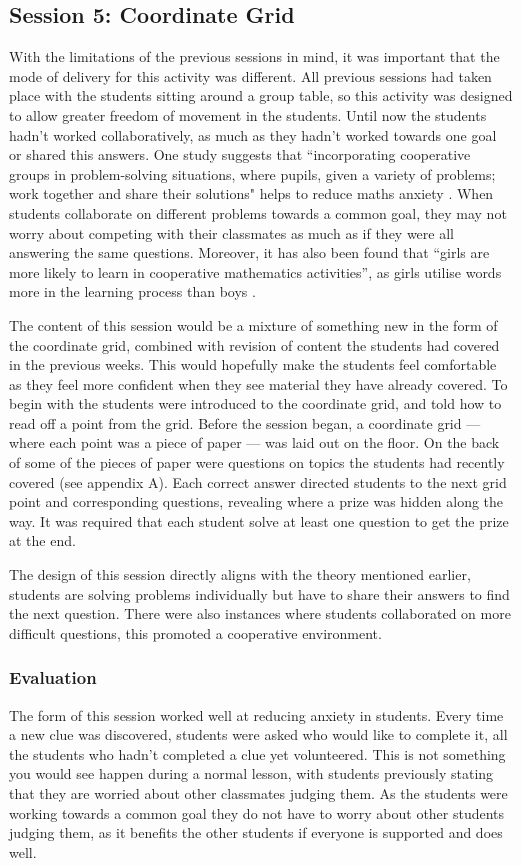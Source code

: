 \documentclass[11pt, a4paper, notitlepage]{article}
\begin{document}
\subsection{Session 5: Coordinate Grid}
With the limitations of the previous sessions in mind, it was important that the mode of delivery for this activity was different. All previous sessions had taken place with the students sitting around a group table, so this activity was designed to allow greater freedom of movement in the students. Until now the students hadn't worked collaboratively, as much as they hadn't worked towards one goal or shared this answers. One study suggests that ``incorporating cooperative groups in problem-solving situations, where pupils, given a  variety of problems; work together and share their solutions" helps to reduce maths anxiety \cite{Alkan:2013}. When students collaborate on different problems towards a common goal, they may not worry about competing with their classmates as much as if they were all answering the same questions. Moreover, it has also been found that ``girls are more likely to learn in cooperative mathematics activities'', as girls utilise words more in the learning process than boys \cite{Hughes:2006}.
\par
The content of this session would be a mixture of something new in the form of the coordinate grid, combined with revision of content the students had covered in the previous weeks. This would hopefully make the students feel comfortable as they feel more confident when they see material they have already covered. To begin with the students were introduced to the coordinate grid, and told how to read off a point from the grid. Before the session began, a coordinate grid --- where each point was a piece of paper --- was laid out on the floor. On the back of some of the pieces of paper were questions on topics the students had recently covered (see appendix A). Each correct answer directed students to the next grid point and corresponding questions, revealing where a prize was hidden along the way. It was required that each student solve at least one question to get the prize at the end. 
\par
The design of this session directly aligns with the theory mentioned earlier, students are solving problems individually but have to share their answers to find the next question. There were also instances where students collaborated on more difficult questions, this promoted a cooperative environment.


\subsubsection*{Evaluation} 
The form of this session worked well at reducing anxiety in students. Every time a new clue was discovered, students were asked who would like to complete it, all the students who hadn't completed a clue yet volunteered. This is not something you would see happen during a normal lesson, with students previously stating that they are worried about other classmates judging them. As the students were working towards a common goal they do not have to worry about other students judging them, as it benefits the other students if everyone is supported and does well.
\end{document}
